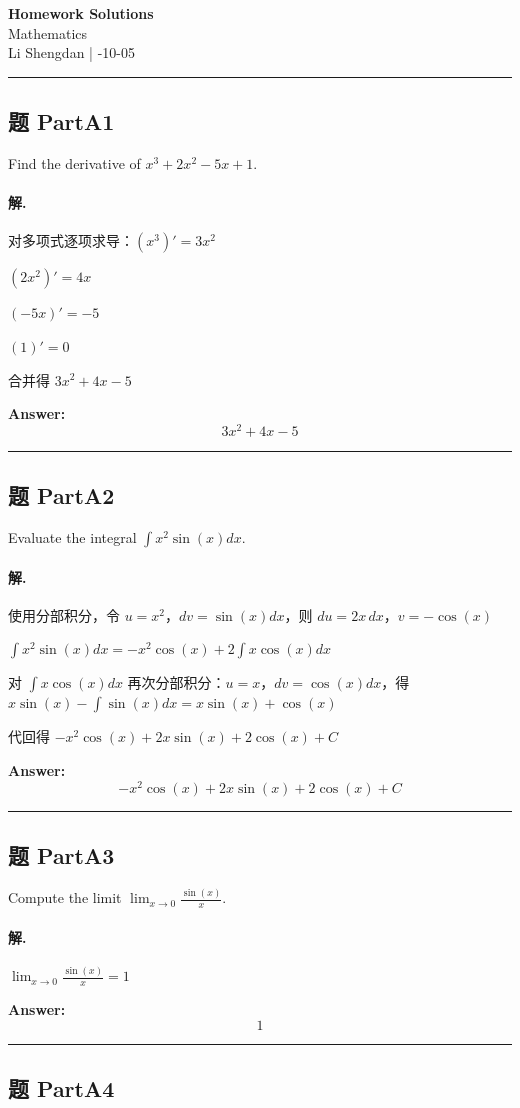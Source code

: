 \documentclass[12pt, a4paper]{article}
\newcommand{\problem}[1]{\subsection*{题 #1}}
\newcommand{\solution}{\paragraph{解.}}
\begin{document}
\begin{center}
    {\LARGE\bfseries Homework Solutions} \\[0.5em]
    {\large Mathematics} \\[0.3em]
    Li Shengdan \quad | -10-05
\end{center}

\hrule
\vspace{1em}
\problem{PartA1}

Find the derivative of $x^3 + 2x^2 - 5x + 1$.

\solution

对多项式逐项求导：$(x^3)' = 3x^2$

$(2x^2)' = 4x$

$(-5x)' = -5$

$(1)' = 0$

合并得 $3x^2 + 4x - 5$

\textbf{Answer:}
\[\boxed{3x^2 + 4x - 5}\]

\vspace{1em}
\hrule
\vspace{1em}

\problem{PartA2}

Evaluate the integral $\int x^2 \sin(x) dx$.

\solution

使用分部积分，令 $u = x^2$，$dv = \sin(x)dx$，则 $du = 2x\,dx$，$v = -\cos(x)$

$\int x^2\sin(x)dx = -x^2\cos(x) + 2\int x\cos(x)dx$

对 $\int x\cos(x)dx$ 再次分部积分：$u = x$，$dv = \cos(x)dx$，得 $x\sin(x) - \int \sin(x)dx = x\sin(x) + \cos(x)$

代回得 $-x^2\cos(x) + 2x\sin(x) + 2\cos(x) + C$

\textbf{Answer:}
\[\boxed{-x^2\cos(x) + 2x\sin(x) + 2\cos(x) + C}\]

\vspace{1em}
\hrule
\vspace{1em}

\problem{PartA3}

Compute the limit $\lim_{x \to 0} \frac{\sin(x)}{x}$.

\solution

$\lim_{x \to 0} \frac{\sin{\left(x \right)}}{x} = 1$

\textbf{Answer:}
\[\boxed{1}\]

\vspace{1em}
\hrule
\vspace{1em}

\problem{PartA4}
\end{document}
